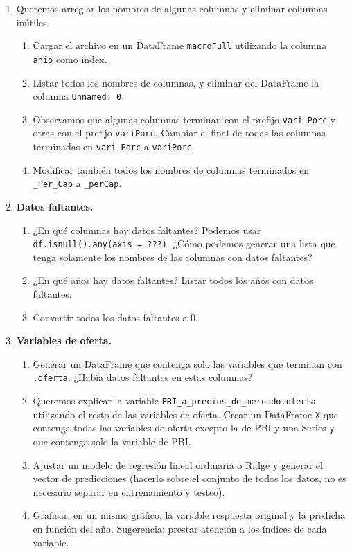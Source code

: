 \documentclass[a4paper,11pt]{article}
\theoremstyle{definition}
\begin{document}
\begin{enumerate}[resume]
\item Queremos arreglar los nombres de algunas columnas y eliminar columnas inútiles.
\begin{enumerate}
\item Cargar el archivo en un DataFrame \lstinline{macroFull} utilizando la columna \lstinline{anio} como index.
\item Listar todos los nombres de columnas, y eliminar del DataFrame la columna \lstinline{Unnamed: 0}.
\item Observamos que algunas columnas terminan con el prefijo \lstinline{vari_Porc} y otras con el prefijo \lstinline{variPorc}. Cambiar el final de todas las columnas terminadas en \lstinline{vari_Porc} a \lstinline{variPorc}.
\item Modificar también todos los nombres de columnas terminados en \lstinline{_Per_Cap} a \lstinline{_perCap}.
\end{enumerate}

\item \textbf{Datos faltantes.}
\begin{enumerate}
\item ¿En qué columnas hay datos faltantes? Podemos usar \lstinline{df.isnull().any(axis = ???)}. ¿Cómo podemos generar una lista que tenga solamente los nombres de las columnas con datos faltantes?
\item ¿En qué años hay datos faltantes? Listar todos los años con datos faltantes.
\item Convertir todos los datos faltantes a 0.
\end{enumerate}

\item \textbf{Variables de oferta.}
\begin{enumerate}
\item Generar un DataFrame que contenga solo las variables que terminan con \lstinline{.oferta}. ¿Había datos faltantes en estas columnas?
\item Queremos explicar la variable \lstinline{PBI_a_precios_de_mercado.oferta} utilizando el resto de las variables de oferta. Crear un DataFrame \lstinline{X} que contenga todas las variables de oferta excepto la de PBI y una Series \lstinline{y} que contenga solo la variable de PBI.
\item Ajustar un modelo de regresión lineal ordinaria o Ridge y generar el vector de predicciones (hacerlo sobre el conjunto de todos los datos, no es necesario separar en entrenamiento y testeo).
\item Graficar, en un mismo gráfico, la variable respuesta original y la predicha en función del año. Sugerencia: prestar atención a los índices de cada variable.
\end{enumerate}

\end{enumerate}
\end{document}
